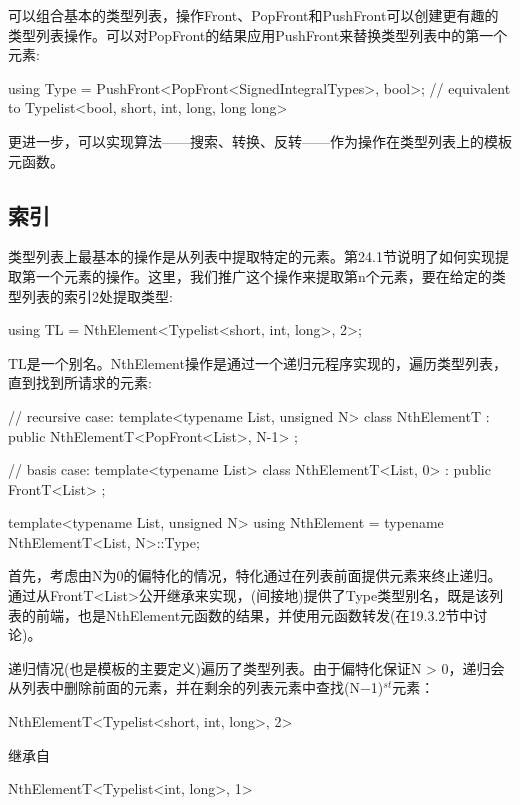 
可以组合基本的类型列表，操作Front、PopFront和PushFront可以创建更有趣的类型列表操作。可以对PopFront的结果应用PushFront来替换类型列表中的第一个元素:

\begin{cpp}
using Type = PushFront<PopFront<SignedIntegralTypes>, bool>;
			// equivalent to Typelist<bool, short, int, long, long long>
\end{cpp}

更进一步，可以实现算法——搜索、转换、反转——作为操作在类型列表上的模板元函数。

\subsection{索引}

类型列表上最基本的操作是从列表中提取特定的元素。第24.1节说明了如何实现提取第一个元素的操作。这里，我们推广这个操作来提取第n个元素，要在给定的类型列表的索引2处提取类型:

\begin{cpp}
using TL = NthElement<Typelist<short, int, long>, 2>;
\end{cpp}

TL是一个别名。NthElement操作是通过一个递归元程序实现的，遍历类型列表，直到找到所请求的元素:

\begin{cpp}
// recursive case:
template<typename List, unsigned N>
class NthElementT : public NthElementT<PopFront<List>, N-1>
{
};

// basis case:
template<typename List>
class NthElementT<List, 0> : public FrontT<List>
{
};

template<typename List, unsigned N>
using NthElement = typename NthElementT<List, N>::Type;
\end{cpp}

首先，考虑由N为0的偏特化的情况，特化通过在列表前面提供元素来终止递归。通过从FrontT<List>公开继承来实现，(间接地)提供了Type类型别名，既是该列表的前端，也是NthElement元函数的结果，并使用元函数转发(在19.3.2节中讨论)。

递归情况(也是模板的主要定义)遍历了类型列表。由于偏特化保证N > 0，递归会从列表中删除前面的元素，并在剩余的列表元素中查找(N−1)$ ^{st} $元素：

\begin{cpp}
NthElementT<Typelist<short, int, long>, 2>
\end{cpp}

继承自

\begin{cpp}
NthElementT<Typelist<int, long>, 1>
\end{cpp}

